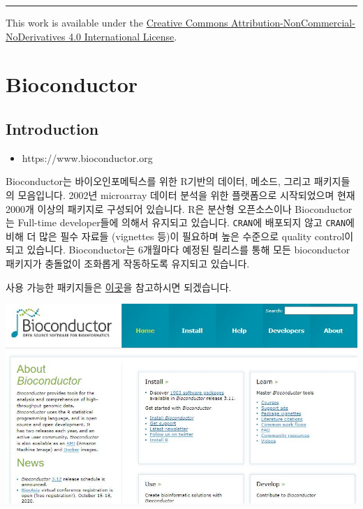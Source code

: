 \documentclass[
  a4paper,
]{book}
\providecommand{\tightlist}{%
  \setlength{\itemsep}{0pt}\setlength{\parskip}{0pt}}\usepackage{longtable,booktabs,array}
\begin{document}
\begin{center}\rule{0.5\linewidth}{0.5pt}\end{center}

This work is available under the
\href{http://creativecommons.org/licenses/by-nc-nd/4.0/}{Creative
Commons Attribution-NonCommercial-NoDerivatives 4.0 International
License}.


\hypertarget{bioconductor}{%
\chapter{Bioconductor}\label{bioconductor}}

\hypertarget{introduction-4}{%
\section{Introduction}\label{introduction-4}}

\begin{itemize}
\tightlist
\item
  https://www.bioconductor.org
\end{itemize}

Bioconductor는 바이오인포메틱스를 위한 R기반의 데이터, 메소드, 그리고
패키지들의 모음입니다. 2002년 microarray 데이터 분석을 위한 플랫폼으로
시작되었으며 현재 2000개 이상의 패키지로 구성되어 있습니다. R은 분산형
오픈소스이나 Bioconductor는 Full-time developer들에 의해서 유지되고
있습니다. \texttt{CRAN}에 배포되지 않고 \texttt{CRAN}에 비해 더 많은
필수 자료들 (vignettes 등)이 필요하며 높은 수준으로 quality control이
되고 있습니다. Bioconductor는 6개월마다 예정된 릴리스를 통해 모든
bioconductor 패키지가 충돌없이 조화롭게 작동하도록 유지되고 있습니다.

사용 가능한 패키지들은
\href{http://bioconductor.org/packages/release/BiocViews.html\#___Software}{이곳}을
참고하시면 되겠습니다.

\includegraphics[width=6.25in,height=\textheight]{images/04/bioconductor.JPG}
\end{document}

